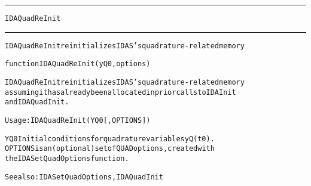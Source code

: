 \begin{samepage}
\hrule
\begin{center}
{\large \verb!IDAQuadReInit!}
\label{p:IDAQuadReInit}
\end{center}
\hrule\vspace{0.1in}



\begin{alltt}
IDAQuadReInit reinitializes IDAS's quadrature-related memory
\end{alltt}

\end{samepage}



\begin{samepage}


\begin{alltt}
function IDAQuadReInit(yQ0, options) 
\end{alltt}

\end{samepage}



\begin{alltt}
IDAQuadReInit reinitializes IDAS's quadrature-related memory
   assuming it has already been allocated in prior calls to IDAInit 
   and IDAQuadInit.

   Usage: IDAQuadReInit ( YQ0 [, OPTIONS ] ) 

   YQ0      Initial conditions for quadrature variables yQ(t0).
   OPTIONS  is an (optional) set of QUAD options, created with
            the IDASetQuadOptions function. 

   See also: IDASetQuadOptions, IDAQuadInit
\end{alltt}






\vspace{0.1in}
